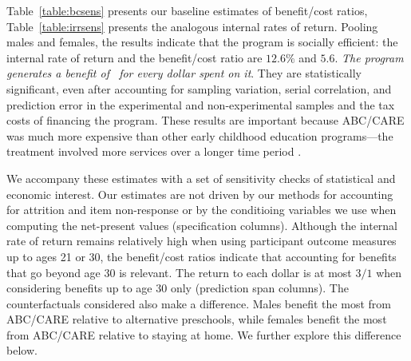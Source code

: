 Table~\ref{table:bcsens} presents our baseline estimates of benefit/cost ratios, Table~\ref{table:irrsens} presents the analogous internal rates of return. Pooling males and females, the results indicate that the program is socially efficient: the internal rate of return and the benefit/cost ratio are $12.6\%$ and $5.6$. \textit{The program generates a benefit of \bcp\ for every dollar spent on it}. They are statistically significant, even after accounting for sampling variation, serial correlation, and prediction error in the experimental and non-experimental samples and the tax costs of financing the program. These results are important because ABC/CARE was much more expensive than other early childhood education programs---the treatment involved more services over a longer time period \citep{Elango_Hojman_etal_2016_Early-Edu}.

We accompany these estimates with a set of sensitivity checks of statistical and economic interest. Our estimates are not driven by our methods for accounting for attrition and item non-response or by the conditioing variables we use when computing the net-present values (specification columns).  Although the internal rate of return remains relatively high when using participant outcome measures up to ages 21 or 30, the benefit/cost ratios indicate that accounting for benefits that go beyond age 30 is relevant. The return to each dollar is at most $3/1$ when considering benefits up to age 30 only (prediction span columns). The counterfactuals considered also make a difference. Males benefit the most from ABC/CARE relative to alternative preschools, while females benefit the most from ABC/CARE relative to staying at home. We further explore this difference below.

